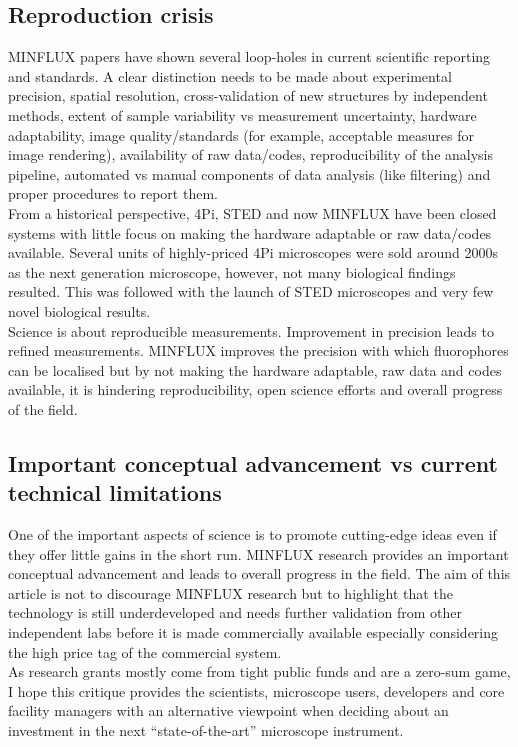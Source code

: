 \documentclass[9pt,twocolumn,twoside]{pnas-new}
\begin{document}
\subsection{Reproduction crisis}
MINFLUX papers have shown several loop-holes in current scientific reporting and standards. A clear distinction needs to be made about experimental precision, spatial resolution, cross-validation of new structures by independent methods, extent of sample variability vs measurement uncertainty, hardware adaptability, image quality/standards (for example, acceptable measures for image rendering), availability of raw data/codes, reproducibility of the analysis pipeline, automated vs manual components of data analysis (like filtering) and proper procedures to report them. \\
From a historical perspective, 4Pi, STED and now MINFLUX have been closed systems with little focus on making the hardware adaptable or raw data/codes available. Several units of highly-priced 4Pi microscopes were sold around 2000s as the next generation microscope, however, not many biological findings resulted. This was followed with the launch of STED microscopes and very few novel biological results. \\%
Science is about reproducible measurements. Improvement in precision leads to refined measurements. MINFLUX improves the precision with which fluorophores can be localised but by not making the hardware adaptable, raw data and codes available, it is hindering reproducibility, open science efforts and overall progress of the field.  

\subsection{Important conceptual advancement vs current technical limitations} 
One of the important aspects of science is to promote cutting-edge ideas even if they offer little gains in the short run. MINFLUX research provides an important conceptual advancement and leads to overall progress in the field. The aim of this article is not to discourage MINFLUX research but to highlight that the technology is still underdeveloped and needs further validation from other independent labs before it is made commercially available especially considering the high price tag of the commercial system. \\
As research grants mostly come from tight public funds and are a zero-sum game, I hope this critique provides the scientists, microscope users, developers and core facility managers with an alternative viewpoint when deciding about an investment in the next ``state-of-the-art” microscope instrument.  
\end{document}
